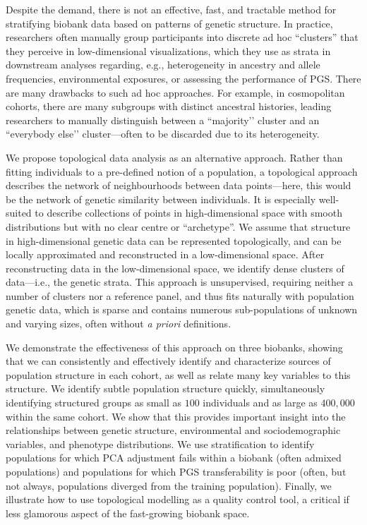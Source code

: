 Despite the demand, there is not an effective, fast, and tractable method for stratifying biobank data based on patterns of genetic structure. In practice, researchers often manually group participants into discrete ad hoc ``clusters'' that they perceive in low-dimensional visualizations, which they use as strata in downstream analyses regarding, e.g., heterogeneity in ancestry and allele frequencies\citep{halldorsson_sequences_2022}, environmental exposures\citep{diaz-papkovich_umap_2019}, or assessing the performance of PGS\citep{sakaue_dimensionality_2020,martin_clinical_2019}. There are many drawbacks to such ad hoc approaches. For example, in cosmopolitan cohorts, there are many subgroups with distinct ancestral histories, leading researchers to manually distinguish between a ``majority’’ cluster and an ``everybody else’’ cluster---often to be discarded due to its heterogeneity\citep{ben-eghan_dont_2020,martschenko_including_2023}. 

We propose topological data analysis as an alternative approach. Rather than fitting individuals to a pre-defined notion of a population, a topological approach describes the network of neighbourhoods between data points---here, this would be the network of genetic similarity between individuals. It is especially well-suited to describe collections of points in high-dimensional space with smooth distributions but with no clear centre or ``archetype''. We assume that structure in high-dimensional genetic data can be represented topologically, and can be locally approximated and reconstructed in a low-dimensional space. After reconstructing data in the low-dimensional space, we identify dense clusters of data---i.e., the genetic strata. This approach is unsupervised, requiring neither a number of clusters nor a reference panel, and thus fits naturally with population genetic data, which is sparse and contains numerous sub-populations of unknown and varying sizes, often without \emph{a priori} definitions. 

We demonstrate the effectiveness of this approach on three biobanks, showing that we can consistently and effectively identify and characterize sources of population structure in each cohort, as well as relate many key variables to this structure. We identify subtle population structure quickly, simultaneously identifying structured groups as small as $100$ individuals and as large as $400,000$ within the same cohort. We show that this provides important insight into the relationships between genetic structure, environmental and sociodemographic variables, and phenotype distributions. We use stratification to identify populations for which PCA adjustment fails within a biobank (often admixed populations) and populations for which PGS transferability is poor (often, but not always, populations diverged from the training population). Finally, we illustrate how to use topological modelling as a quality control tool, a critical if less glamorous aspect of the fast-growing biobank space.

